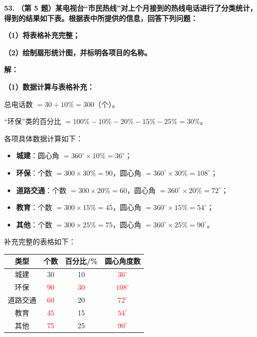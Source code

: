 \vspace{0.6cm}

\textbf{\LARGE 53.} \textbf{（第 5 题）某电视台“市民热线”对上个月接到的热线电话进行了分类统计，得到的结果如下表。根据表中所提供的信息，回答下列问题：}

\textbf{（1）将表格补充完整；}

\textbf{（2）绘制扇形统计图，并标明各项目的名称。}

\vspace{0.4cm}
\textbf{解：}

\textbf{（1）数据计算与表格补充：}

总电话数 $= 30 \div 10\% = 300$（个）。

“环保”类的百分比 $= 100\% - 10\% - 20\% - 15\% - 25\% = 30\%$。

各项具体数据计算如下：
\begin{itemize}
    \item \textbf{城建}：圆心角 $= 360^\circ \times 10\% = 36^\circ$；
    \item \textbf{环保}：个数 $= 300 \times 30\% = 90$，圆心角 $= 360^\circ \times 30\% = 108^\circ$；
    \item \textbf{道路交通}：个数 $= 300 \times 20\% = 60$，圆心角 $= 360^\circ \times 20\% = 72^\circ$；
    \item \textbf{教育}：个数 $= 300 \times 15\% = 45$，圆心角 $= 360^\circ \times 15\% = 54^\circ$；
    \item \textbf{其他}：个数 $= 300 \times 25\% = 75$，圆心角 $= 360^\circ \times 25\% = 90^\circ$。
\end{itemize}

补充完整的表格如下：

\begin{center}
\renewcommand{\arraystretch}{1.5}
\begin{tabular}{|c|c|c|c|}
\hline
\rowcolor{gray!25}
类型 & 个数 & 百分比/\% & 圆心角度数 \\
\hline
城建 & 30 & 10 & \textcolor{red}{$36^\circ$} \\
\hline
环保 & \textcolor{red}{90} & \textcolor{red}{30} & \textcolor{red}{$108^\circ$} \\
\hline
道路交通 & \textcolor{red}{60} & 20 & \textcolor{red}{$72^\circ$} \\
\hline
教育 & \textcolor{red}{45} & 15 & \textcolor{red}{$54^\circ$} \\
\hline
其他 & \textcolor{red}{75} & 25 & \textcolor{red}{$90^\circ$} \\
\hline
\end{tabular}
\end{center}

